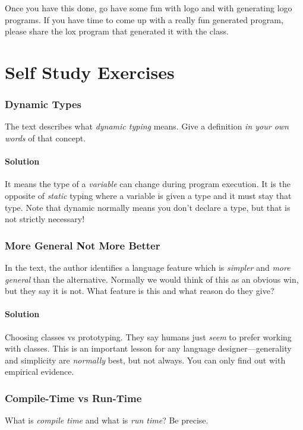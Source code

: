 \documentclass[twoside=false, DIV=14]{scrartcl}
\begin{document}
Once you have this done, go have some fun with logo and with generating logo programs.  If you have time to come up with a really fun generated program, please share the lox program that generated it with the class.

\newpage
\part*{Self Study Exercises}

\section*{Dynamic Types}
The text describes what \emph{dynamic typing} means. Give a definition \emph{in your own words} of that concept.

\subsection*{Solution}
It means the type of a \emph{variable} can change during program execution. It is the opposite of \emph{static} typing where a variable is given a type and it must stay that type. Note that dynamic normally means you don't declare a type, but that is not strictly necessary!

\section*{More General Not More Better}
In the text, the author identifies a language feature which is \emph{simpler} and \emph{more general} than the alternative. Normally we would think of this as an obvious win, but they say it is not. What feature is this and what reason do they give?

\subsection*{Solution}
Choosing classes vs prototyping. They say humans just \emph{seem} to prefer working with classes. This is an important lesson for any language designer—generality and simplicity are \emph{normally} best, but not always. You can only find out with empirical evidence.

\section*{Compile-Time vs Run-Time}
What is \emph{compile time} and what is \emph{run time}? Be precise.
\end{document}
